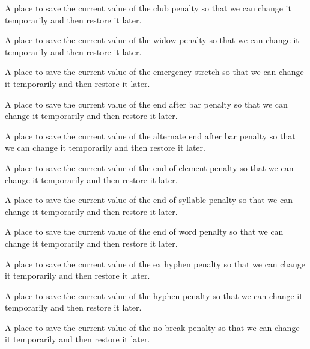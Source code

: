 A place to save the current value of the club penalty so that we can change it temporarily and then restore it later.

A place to save the current value of the widow penalty so that we can change it temporarily and then restore it later.

A place to save the current value of the emergency stretch so that we can change it temporarily and then restore it later.

A place to save the current value of the end after bar penalty so that we can change it temporarily and then restore it later.

A place to save the current value of the alternate end after bar penalty so that we can change it temporarily and then restore it later.

A place to save the current value of the end of element penalty so that we can change it temporarily and then restore it later.

A place to save the current value of the end of syllable penalty so that we can change it temporarily and then restore it later.

A place to save the current value of the end of word penalty so that we can change it temporarily and then restore it later.

A place to save the current value of the ex hyphen penalty so that we can change it temporarily and then restore it later.

A place to save the current value of the hyphen penalty so that we can change it temporarily and then restore it later.

A place to save the current value of the no break penalty so that we can change it temporarily and then restore it later.


